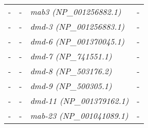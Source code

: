 \documentclass[../main.tex]{subfiles}
\begin{document}
\begin{longtable}{llll}
	-                                                       & -                                                                                                      & \textit{mab3 (NP\_001256882.1)}                                                                    & -                     \\ [0.1cm]
	-                                                       & -                                                                                                      & \textit{dmd-3 (NP\_001256883.1)}                                                                   & -                     \\ [0.1cm]
	-                                                       & -                                                                                                      & \textit{dmd-6 (NP\_001370045.1)}                                                                   & -                     \\ [0.1cm]
	-                                                       & -                                                                                                      & \textit{dmd-7 (NP\_741551.1)}                                                                      & -                     \\ [0.1cm]
	-                                                       & -                                                                                                      & \textit{dmd-8 (NP\_503176.2)}                                                                      & -                     \\ [0.1cm]
	-                                                       & -                                                                                                      & \textit{dmd-9 (NP\_500305.1)}                                                                      & -                     \\ [0.1cm]
	-                                                       & -                                                                                                      & \textit{dmd-11 (NP\_001379162.1)}                                                                  & -                     \\ [0.1cm]
	-                                                       & -                                                                                                      & \textit{mab-23 (NP\_001041089.1)}                                                                  & -                     \\* \midrule

\end{longtable}
\end{document}
